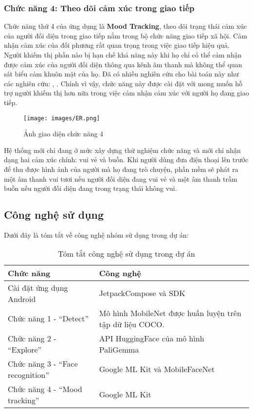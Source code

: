 \documentclass[a4paper,12pt]{article}
\begin{document}
\subsubsection{Chức năng 4: Theo dõi cảm xúc trong giao tiếp}
Chức năng thứ 4 của ứng dụng là \textbf{Mood Tracking}, theo dõi trạng thái cảm xúc của người đối diện trong giao tiếp nằm trong bộ chức năng giao tiếp xã hội. Cảm nhận cảm xúc của đối phương rất quan trọng trong việc giao tiếp hiệu quả. Người khiếm thị phần nào bị hạn chế khả năng này khi họ chỉ có thể cảm nhận được cảm xúc của người đối diện thông qua kênh âm thanh mà không thể quan sát biểu cảm khuôn mặt của họ. Đã có nhiều nghiên cứu cho bài toán này như các nghiên cứu: \cite{akhand2021facial}, \cite{lutfallah2022emotion}. Chính vì vậy, chức năng này được cài đặt với mong muốn hỗ trợ người khiếm thị hơn nữa trong việc cảm nhận cảm xúc với người họ đang giao tiếp. 
\begin{figure}[H]
    \centering
    \texttt{[image: images/ER.png]}
    \caption{Ảnh giao diện chức năng 4}
\end{figure}

Hệ thống mới chỉ đang ở mức xây dựng thử nghiệm chức năng và mới chỉ nhận dạng hai cảm xúc chính: vui vẻ và buồn. Khi người dùng đưa điện thoại lên trước để thu được hình ảnh của người mà họ đang trò chuyện, phần mềm sẽ phát ra một âm thanh vui tươi nếu người đối diện đang vui vẻ và một âm thanh trầm buồn nếu người đối diện đang trong trạng thái không vui. 

\subsection{Công nghệ sử dụng}
Dưới đây là tóm tắt về công nghệ nhóm sử dụng trong dự án:

\begin{table}[h!]
\centering
\begin{tabular}{|p{6cm}|p{8cm}|}
\hline
\textbf{Chức năng} & \textbf{Công nghệ} \\ 
\hline
Cài đặt ứng dụng Android & JetpackCompose và SDK \\ 
\hline
Chức năng 1 - ``Detect'' & Mô hình MobileNet được huấn luyện trên tập dữ liệu COCO. \\ 
\hline
Chức năng 2 - ``Explore'' & API HuggingFace của mô hình PaliGemma \\ 
\hline
Chức năng 3 - ``Face recognition'' & Google ML Kit và MobileFaceNet \\ 
\hline
Chức năng 4 - ``Mood tracking'' & Google ML Kit \\ 
\hline
\end{tabular}
\caption{Tóm tắt công nghệ sử dụng trong dự án}
\label{table:tech_summary}
\end{table}
\end{document}
